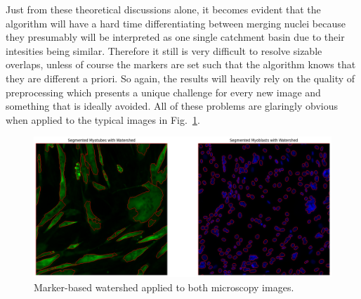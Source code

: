 Just from these theoretical discussions alone, it becomes evident that the algorithm will have a hard time differentiating between merging nuclei because they presumably will be interpreted as one single catchment basin due to their intesities being similar. Therefore it still is very difficult to resolve sizable overlaps, unless of course the markers are set such that the algorithm knows that they are different a priori. So again, the results will heavily rely on the quality of preprocessing which presents a unique challenge for every new image and something that is ideally avoided. All of these problems are glaringly obvious when applied to the typical images in Fig.~\ref{figwatershed}.

\begin{figure}
	\centering
	\includegraphics[width=\textwidth]{"images/watershed.png"}
	\caption[Application of watershed]{Marker-based watershed applied to both microscopy images.}
	\label{figwatershed}
\end{figure}

\newpage
